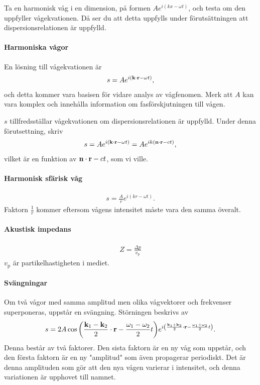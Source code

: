 \deriv
Ta en harmonisk våg i en dimension, på formen $Ae^{i(kx - \omega t)}$, och testa om den uppfyller vågekvationen. Då ser du att detta uppfylls under förutsättningen att dispersionsrelationen är uppfylld.

\paragraph{Harmoniska vågor}
En lösning till vågekvationen är
\begin{align*}
	s = Ae^{i(\vect{k}\cdot\vect{r} - \omega t)},
\end{align*}
och detta kommer vara basisen för vidare analys av vågfenomen. Merk att $A$ kan vara komplex och innehålla information om fasförskjutningen till vågen.

\deriv
$s$ tillfredsställar vågekvationen om dispersionsrelationen är uppfylld. Under denna förutsettning, skriv
\begin{align*}
	s = Ae^{i(\vect{k}\cdot\vect{r} - \omega t)} = Ae^{ik(\vect{n}\cdot\vect{r} - ct)},
\end{align*}
vilket är en funktion av $\vect{n}\cdot\vect{r} - ct$, som vi ville.

\paragraph{Harmonisk sfärisk våg}
\begin{align*}
	s = \frac{A}{r}e^{i(kr - \omega t)}.
\end{align*}
Faktorn $\frac{1}{r}$ kommer eftersom vågens intensitet måste vara den samma överalt.

\paragraph{Akustisk impedans}
\begin{align*}
	Z = \frac{\Delta p}{v_{\text{p}}}
\end{align*}
$v_{\text{p}}$ är partikelhastigheten i mediet.

\paragraph{Svängningar}
Om två vågor med samma amplitud men olika vågvektorer och frekvenser superponeras, uppstår en svängning. Störningen beskrivs av
\begin{align*}
	s = 2A\cos{\left(\frac{\vect{k}_{1} - \vect{k}_{2}}{2}\cdot\vect{r} - \frac{\omega_{1} - \omega_{2}}{2}t\right)}e^{i\left(\frac{\vect{k}_{1} + \vect{k}_{2}}{2}\cdot\vect{r} - \frac{\omega_{1} + \omega_{2}}{2}t\right)}.
\end{align*}
Denna består av två faktorer. Den sista faktorn är en ny våg som uppstår, och den första faktorn är en ny "amplitud" som även propagerar periodiskt. Det är denna amplituden som gör att den nya vågen varierar i intensitet, och denna variationen är upphovet till namnet.


